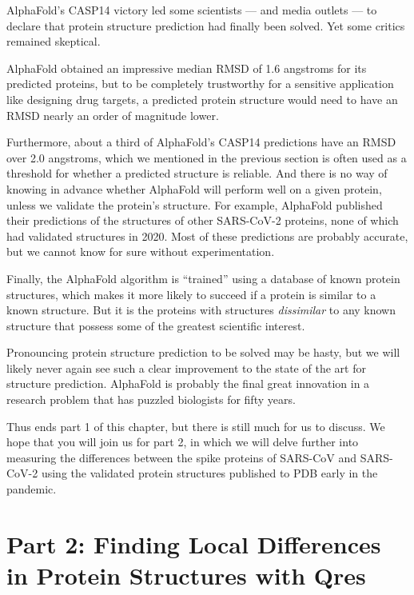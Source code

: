 AlphaFold's CASP14 victory led some scientists --- and media outlets --- to declare that protein structure prediction had finally been solved. Yet some critics remained skeptical.

AlphaFold obtained an impressive median RMSD of 1.6 angstroms for its predicted proteins, but to be completely trustworthy for a sensitive application like designing drug targets, a predicted protein structure would need to have an RMSD nearly an order of magnitude lower.

Furthermore, about a third of AlphaFold's CASP14 predictions have an RMSD over 2.0 angstroms, which we mentioned in the previous section is often used as a threshold for whether a predicted structure is reliable. And there is no way of knowing in advance whether AlphaFold will perform well on a given protein, unless we validate the protein's structure. For example, AlphaFold published their predictions of the structures of other SARS-CoV-2 proteins, none of which had validated structures in 2020. Most of these predictions are probably accurate, but we cannot know for sure without experimentation.

Finally, the AlphaFold algorithm is ``trained'' using a database of known protein structures, which makes it more likely to succeed if a protein is similar to a known structure. But it is the proteins with structures \textit{dissimilar} to any known structure that possess some of the greatest scientific interest.

Pronouncing protein structure prediction to be solved may be hasty, but we will likely never again see such a clear improvement to the state of the art for structure prediction. AlphaFold is probably the final great innovation in a research problem that has puzzled biologists for fifty years.

Thus ends part 1 of this chapter, but there is still much for us to discuss. We hope that you will join us for part 2, in which we will delve further into measuring the differences between the spike proteins of SARS-CoV and SARS-CoV-2 using the validated protein structures published to PDB early in the pandemic.\\

\FloatBarrier
{}

\section{Part 2: Finding Local Differences in Protein Structures with Qres}
\label{sec:multiseq}

